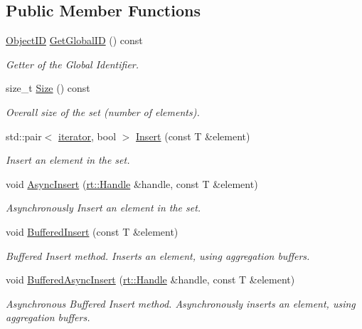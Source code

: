 \subsection*{Public Member Functions}
\begin{DoxyCompactItemize}
\item 
\hyperlink{classshad_1_1Set_a05ba25e24c892602d707b21e3e4300b9}{Object\-I\-D} \hyperlink{classshad_1_1Set_a4c57c459143fba4dc825e77217eb66c7}{Get\-Global\-I\-D} () const 
\begin{DoxyCompactList}\small\item\em Getter of the Global Identifier. \end{DoxyCompactList}\item 
size\-\_\-t \hyperlink{classshad_1_1Set_aefd9d547c7a8a720769e55cafc6802cf}{Size} () const 
\begin{DoxyCompactList}\small\item\em Overall size of the set (number of elements). \end{DoxyCompactList}\item 
std\-::pair$<$ \hyperlink{classshad_1_1Set_a01298773ecde90c0df1e444429bf9703}{iterator}, bool $>$ \hyperlink{classshad_1_1Set_abc2fb49844cb251c26472ccf490e4ea4}{Insert} (const T \&element)
\begin{DoxyCompactList}\small\item\em Insert an element in the set. \end{DoxyCompactList}\item 
void \hyperlink{classshad_1_1Set_a323831242d5737325df067e252c9d5b3}{Async\-Insert} (\hyperlink{classshad_1_1rt_1_1Handle}{rt\-::\-Handle} \&handle, const T \&element)
\begin{DoxyCompactList}\small\item\em Asynchronously Insert an element in the set. \end{DoxyCompactList}\item 
void \hyperlink{classshad_1_1Set_a1ac85f834d9ccd281f56c36742730e97}{Buffered\-Insert} (const T \&element)
\begin{DoxyCompactList}\small\item\em Buffered Insert method. Inserts an element, using aggregation buffers. \end{DoxyCompactList}\item 
void \hyperlink{classshad_1_1Set_a2d3f1919275884a863577853d05c64f2}{Buffered\-Async\-Insert} (\hyperlink{classshad_1_1rt_1_1Handle}{rt\-::\-Handle} \&handle, const T \&element)
\begin{DoxyCompactList}\small\item\em Asynchronous Buffered Insert method. Asynchronously inserts an element, using aggregation buffers. \end{DoxyCompactList}\item 

\end{DoxyCompactItemize}
